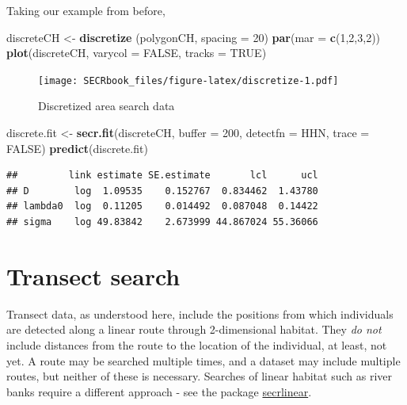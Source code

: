\documentclass[
]{book}
\newenvironment{Shaded}{\begin{snugshade}}{\end{snugshade}}
\newcommand{\AttributeTok}[1]{\textcolor[rgb]{0.13,0.29,0.53}{#1}}
\newcommand{\ConstantTok}[1]{\textcolor[rgb]{0.56,0.35,0.01}{#1}}
\newcommand{\DecValTok}[1]{\textcolor[rgb]{0.00,0.00,0.81}{#1}}
\newcommand{\FunctionTok}[1]{\textcolor[rgb]{0.13,0.29,0.53}{\textbf{#1}}}
\newcommand{\NormalTok}[1]{#1}
\newcommand{\OtherTok}[1]{\textcolor[rgb]{0.56,0.35,0.01}{#1}}
\newcommand{\StringTok}[1]{\textcolor[rgb]{0.31,0.60,0.02}{#1}}
\begin{document}
Taking our example from before,

\begin{Shaded}
\begin{Highlighting}[]
\NormalTok{discreteCH }\OtherTok{\textless{}{-}} \FunctionTok{discretize}\NormalTok{ (polygonCH, }\AttributeTok{spacing =} \DecValTok{20}\NormalTok{)}
\FunctionTok{par}\NormalTok{(}\AttributeTok{mar =} \FunctionTok{c}\NormalTok{(}\DecValTok{1}\NormalTok{,}\DecValTok{2}\NormalTok{,}\DecValTok{3}\NormalTok{,}\DecValTok{2}\NormalTok{))}
\FunctionTok{plot}\NormalTok{(discreteCH, }\AttributeTok{varycol =} \ConstantTok{FALSE}\NormalTok{, }\AttributeTok{tracks =} \ConstantTok{TRUE}\NormalTok{)}
\end{Highlighting}
\end{Shaded}

\begin{figure}
\centering
\texttt{[image: SECRbook\_files/figure-latex/discretize-1.pdf]}
\caption{\label{fig:discretize}Discretized area search data}
\end{figure}

\begin{Shaded}
\begin{Highlighting}[]
\NormalTok{discrete.fit }\OtherTok{\textless{}{-}} \FunctionTok{secr.fit}\NormalTok{(discreteCH, }\AttributeTok{buffer =} \DecValTok{200}\NormalTok{, }\AttributeTok{detectfn =} 
    \StringTok{\textquotesingle{}HHN\textquotesingle{}}\NormalTok{, }\AttributeTok{trace =} \ConstantTok{FALSE}\NormalTok{)}
\FunctionTok{predict}\NormalTok{(discrete.fit)}
\end{Highlighting}
\end{Shaded}

\begin{verbatim}
##         link estimate SE.estimate       lcl      ucl
## D        log  1.09535    0.152767  0.834462  1.43780
## lambda0  log  0.11205    0.014492  0.087048  0.14422
## sigma    log 49.83842    2.673999 44.867024 55.36066
\end{verbatim}

\section{Transect search}\label{transectsearch}

Transect data, as understood here, include the positions from which individuals are detected
along a linear route through 2-dimensional habitat. They \emph{do not} include distances from the route to the location of the individual, at least, not yet. A route may be searched multiple times, and a dataset may include multiple routes, but neither of these is necessary. Searches of linear habitat such as river banks require a different approach - see the package \href{https://cran.r-project.org/package=secrlinear/vignettes/secrlinear-vignette.pdf}{secrlinear}.
\end{document}
